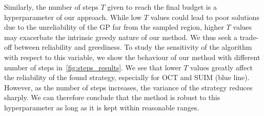 Similarly, the number of steps $T$ given to reach the final budget is a hyperparameter of our approach. While low $T$ values could lead to poor solutions due to the unreliability of the GP far from the sampled region, higher $T$ values may exacerbate the intrinsic greedy nature of our method. We thus seek a trade-off between reliability and greediness. To study the sensitivity of the algorithm with respect to this variable, we show the behaviour of our method with different number of steps in~\cref{fig:steps_results}. We see that lower $T$ values greatly affect the reliability of the found strategy, especially for OCT and SUIM (blue line). However, as the number of steps increases, the variance of the strategy reduces sharply. We can therefore conclude that the method is robust to this hyperparameter as long as it is kept within reasonable ranges.

